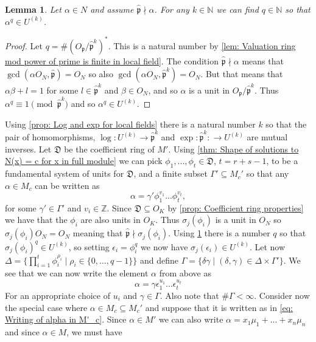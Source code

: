 \documentclass{article}
\newtheorem{lemma}{Lemma}[section]
\newcommand{\mfrak}[1]{\mathfrak{#1}}
\newcommand{\mbb}[1]{\mathbb{#1}}
\numberwithin{equation}{section}
\begin{document}
\begin{lemma}\label{lem: Elements can be mapped to U^(k)}
    Let $\alpha \in N$ and assume $\hat {\mfrak p} \nmid \alpha$. For any $k \in \mbb N$ we can find $q \in \mbb N$ so that $\alpha^q \in U^{(k)}$.
\end{lemma}

\begin{proof}
    Let $q = \# (O_\mfrak p / \hat {\mfrak p}^k)^*$. This is a natural number by \cref{lem: Valuation ring mod power of prime is finite in local field}. The condition $\hat{\mfrak p}\nmid \alpha$ means that $\gcd(\alpha O_N, \hat {\mfrak p}) = O_N$ so also $\gcd(\alpha O_N, \hat {\mfrak p}^k) = O_N$. But that means that $\alpha \beta + l = 1$ for some $l \in {\hat {\mfrak p}}^k$ and $\beta \in O_N$, and so $\alpha$ is a unit in $O_\mfrak p / \hat {\mfrak p}^k$. Thus $\alpha^q \equiv 1 \pmod {\hat{\mfrak p}^k}$ and so $\alpha^q \in U^{(k)}$.
\end{proof}
Using \cref{prop: Log and exp for local fields} there is a natural number $k$ so that the pair of homomorphisms, $\log : U^{(k)} \to \hat {\mfrak p}^k$
and $\exp : \hat {\mfrak p}^k : \to U^{(k)}$ are mutual inverses. Let $\mfrak D$ be the coefficient ring of $M'$. Using \cref{thm: Shape of solutions to N(x) = c for x in full module} we can pick $\phi_1, ..., \phi_t \in \mfrak D$, $t = r + s - 1$, to be a fundamental system of units for $\mfrak D$, and a finite subset $\Gamma' \subseteq M_c'$ so that any $\alpha \in M_c$ can be written as
$$\alpha = \gamma' \phi_1^{v_1} ... \phi_t^{v_t},$$
for some $\gamma' \in \Gamma'$ and $v_i \in \mbb Z$. Since $\mfrak D \subseteq O_K$ by \cref{prop: Coefficient ring properties} we have that the $\phi_i$ are also units in $O_K$. Thus $\sigma_j(\phi_i)$ is a unit in $O_N$ so $\sigma_j(\phi_i) O_N = O_N$ meaning that $\hat {\mfrak p} \nmid \sigma_j(\phi_i)$. Using \cref{lem: Elements can be mapped to U^(k)} there is a number $q$ so that $\sigma_j(\phi_i)^q \in U^{(k)}$, so setting $\epsilon_i = \phi_i^q$ we now have $\sigma_j(\epsilon_i) \in U^{(k)}$. Let now $\Delta = \{\prod_{i = 1}^t \phi_i^{\rho_i} \mid \rho_i \in \{0, ..., q-1 \} \}$ and define $\Gamma = \{\delta \gamma \mid (\delta, \gamma) \in \Delta \times \Gamma' \}$. We see that we can now write the element $\alpha$ from above as
\begin{equation}\label{eq: Writing of alpha in M'_c}
    \alpha = \gamma \epsilon_1^{u_1} ... \epsilon_t^{u_t}
\end{equation}
For an appropriate choice of $u_i$ and $\gamma \in \Gamma$. Also note that $\# \Gamma < \infty$. Consider now the special case where $\alpha \in M_c \subseteq M_c'$ and suppose that it is written as in \cref{eq: Writing of alpha in M'_c}. Since $\alpha \in M'$ we can also write
$\alpha = x_1 \mu_1 + ... + x_n \mu_n$ and since $\alpha \in M$, we must have
\end{document}
